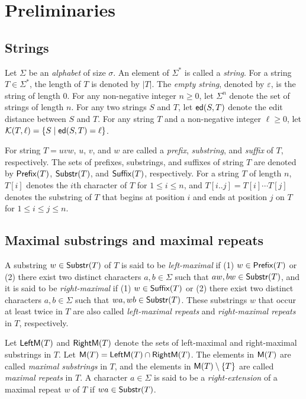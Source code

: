 \section{Preliminaries}

\subsection{Strings}

Let $\Sigma$ be an \emph{alphabet} of size $\sigma$.
An element of $\Sigma^*$ is called a \emph{string}.
For a string $T \in \Sigma^*$, the length of $T$ is denoted by $|T|$.
The \emph{empty string}, denoted by $\varepsilon$, is the string of length $0$.
For any non-negative integer $n \geq 0$,
let $\Sigma^n$ denote the set of strings of length $n$.
%
For any two strings $S$ and $T$,
let $\mathsf{ed}(S,T)$ denote the edit distance between $S$ and $T$.
For any string $T$ and a non-negative integer $\ell \geq 0$,
let $\mathcal{K}(T,\ell) = \{S \mid \mathsf{ed}(S,T) = \ell\}$.

For string $T = uvw$, $u$, $v$, and $w$ are called a \emph{prefix}, \emph{substring},
and \emph{suffix} of $T$, respectively.
The sets of prefixes, substrings, and suffixes of string $T$ are denoted by
$\mathsf{Prefix}(T)$, $\mathsf{Substr}(T)$, and $\mathsf{Suffix}(T)$, respectively.
For a string $T$ of length $n$, $T[i]$ denotes the $i$th character of $T$
for $1 \leq i \leq n$,
and $T[i..j] = T[i] \cdots T[j]$ denotes the substring of $T$ that begins at position $i$ and ends at position $j$ on $T$ for $1 \leq i \leq j \leq n$.

\subsection{Maximal substrings and maximal repeats}

A substring $w \in \mathsf{Substr}(T)$ of $T$ is said to be
\emph{left-maximal} if (1) $w \in \mathsf{Prefix}(T)$
or (2) there exist two distinct characters $a,b \in \Sigma$ such that
$aw, bw \in \mathsf{Substr}(T)$,
and it is said to be \emph{right-maximal}
if (1) $w \in \mathsf{Suffix}(T)$ or (2) there exist two distinct characters $a,b \in \Sigma$ such that $wa, wb \in \mathsf{Substr}(T)$.
These substrings $w$ that occur at least twice in $T$
are also called \emph{left-maximal repeats}
and \emph{right-maximal repeats} in $T$, respectively.

Let $\mathsf{LeftM}(T)$ and $\mathsf{RightM}(T)$ denote the sets of left-maximal
and right-maximal substrings in $T$.
Let $\mathsf{M}(T) = \mathsf{LeftM}(T) \cap \mathsf{RightM}(T)$.
The elements in $\mathsf{M}(T)$ are called \emph{maximal substrings} in $T$,
and the elements in $\mathsf{M}(T) \setminus \{T\}$ are called
\emph{maximal repeats} in $T$.
A character $a \in \Sigma$ is said to be 
a \emph{right-extension} of a maximal repeat $w$ of $T$
if $wa \in \mathsf{Substr}(T)$.

